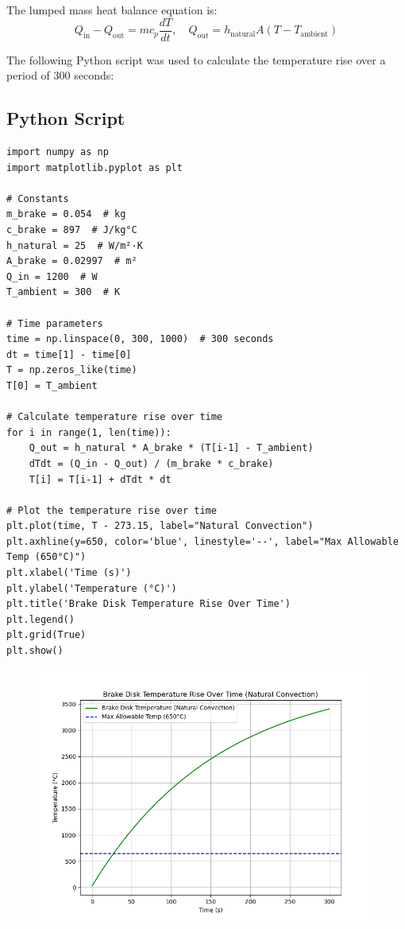 The lumped mass heat balance equation is:
\[
Q_{\text{in}} - Q_{\text{out}} = m c_p \frac{dT}{dt}, \quad Q_{\text{out}} = h_{\text{natural}} A (T - T_{\text{ambient}})
\]

The following Python script was used to calculate the temperature rise over a period of 300 seconds:

\subsection*{Python Script}

\small %
\begin{verbatim}
import numpy as np
import matplotlib.pyplot as plt

# Constants
m_brake = 0.054  # kg
c_brake = 897  # J/kg°C
h_natural = 25  # W/m²·K
A_brake = 0.02997  # m²
Q_in = 1200  # W
T_ambient = 300  # K

# Time parameters
time = np.linspace(0, 300, 1000)  # 300 seconds
dt = time[1] - time[0]
T = np.zeros_like(time)
T[0] = T_ambient

# Calculate temperature rise over time
for i in range(1, len(time)):
    Q_out = h_natural * A_brake * (T[i-1] - T_ambient)
    dTdt = (Q_in - Q_out) / (m_brake * c_brake)
    T[i] = T[i-1] + dTdt * dt

# Plot the temperature rise over time
plt.plot(time, T - 273.15, label="Natural Convection")
plt.axhline(y=650, color='blue', linestyle='--', label="Max Allowable Temp (650°C)")
plt.xlabel('Time (s)')
plt.ylabel('Temperature (°C)')
plt.title('Brake Disk Temperature Rise Over Time')
plt.legend()
plt.grid(True)
plt.show()
\end{verbatim}
\normalsize %

\begin{figure}[H]
    \centering
    \includegraphics[width=0.8\linewidth]{chaps-append/calcs/disk_brake_heat_python.png}
\end{figure}


